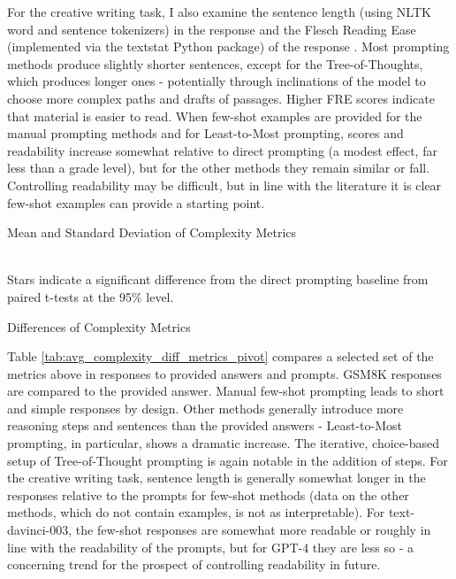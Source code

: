 \documentclass[11pt]{article}
\begin{document}
For the creative writing task, I also examine the sentence length (using NLTK word and sentence tokenizers) in the response and the Flesch Reading Ease (implemented via the textstat Python package) of the response \cite{flesch_how_2016, aggarwal_textstat_nodate}. Most prompting methods produce slightly shorter sentences, except for the Tree-of-Thoughts, which produces longer ones - potentially through inclinations of the model to choose more complex paths and drafts of passages. Higher FRE scores indicate that material is easier to read. When few-shot examples are provided for the manual prompting methods and for Least-to-Most prompting, scores and readability increase somewhat relative to direct prompting (a modest effect, far less than a grade level), but for the other methods they remain similar or fall. Controlling readability may be difficult, but in line with the literature it is clear few-shot examples can provide a starting point. \cite{imperial_flesch_2023}

%


\begin{table}
  \caption{Mean and Standard Deviation of Complexity Metrics}
  \centering
  \tiny
    
  \label{tab:avg_complexity_metrics_pivot}
  \\[10pt] \footnotesize Stars indicate a significant difference from the direct prompting baseline from paired t-tests at the 95\% level.
\end{table}

\begin{table}
  \caption{Differences of Complexity Metrics}
  \centering
  \tiny
    
  \label{tab:avg_complexity_diff_metrics_pivot}
\end{table}



Table \ref{tab:avg_complexity_diff_metrics_pivot} compares a selected set of the metrics above in responses to provided answers and prompts. GSM8K responses are compared to the provided answer. Manual few-shot prompting leads to short and simple responses by design. Other methods generally introduce more reasoning steps and sentences than the provided answers - Least-to-Most prompting, in particular, shows a dramatic increase. The iterative, choice-based setup of Tree-of-Thought prompting is again notable in the addition of steps. For the creative writing task, sentence length is generally somewhat longer in the responses relative to the prompts for few-shot methods (data on the other methods, which do not contain examples, is not as interpretable). For text-davinci-003, the few-shot responses are somewhat more readable or roughly in line with the readability of the prompts, but for GPT-4 they are less so - a concerning trend for the prospect of controlling readability in future.
\end{document}
